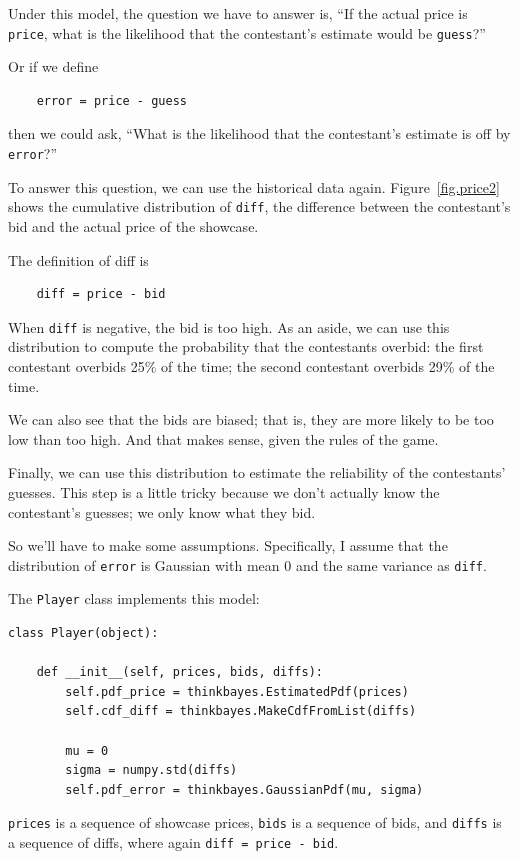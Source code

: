 \documentclass[12pt]{book}
\begin{document}
Under this model, the question we have to answer is, ``If the
actual price is {\tt price}, what is the likelihood that the
contestant's estimate would be {\tt guess}?''

Or if we define
%
\begin{verbatim}
    error = price - guess
\end{verbatim}
%
then we could ask, ``What is the likelihood
that the contestant's estimate is off by {\tt error}?''

To answer this question, we can use the historical data again.
Figure~\ref{fig.price2} shows the cumulative distribution of {\tt diff},
the difference between the contestant's bid and the actual price
of the showcase.

The definition of diff is
%
\begin{verbatim}
    diff = price - bid
\end{verbatim}
%
When {\tt diff} is negative, the bid is too high.  As an
aside, we can use this distribution to compute the probability that the
contestants overbid: the first contestant overbids 25\% of the
time; the second contestant overbids 29\% of the time.

We can also see that the bids are biased;
that is, they are more likely to be too low than too high.  And
that makes sense, given the rules of the game.

Finally, we can use this distribution to estimate the reliability of
the contestants' guesses.  This step is a little tricky because
we don't actually know the contestant's guesses; we only know
what they bid.

So we'll have to make some assumptions.  Specifically, I
assume that the distribution of {\tt error} is Gaussian with mean 0
and the same variance as {\tt diff}.

The {\tt Player} class implements this model:

\begin{verbatim}
class Player(object):

    def __init__(self, prices, bids, diffs):
        self.pdf_price = thinkbayes.EstimatedPdf(prices)
        self.cdf_diff = thinkbayes.MakeCdfFromList(diffs)

        mu = 0
        sigma = numpy.std(diffs)
        self.pdf_error = thinkbayes.GaussianPdf(mu, sigma)
\end{verbatim}

{\tt prices} is a sequence of showcase prices, {\tt bids} is a
sequence of bids, and {\tt diffs} is a sequence of diffs, where
again {\tt diff = price - bid}.
\end{document}
